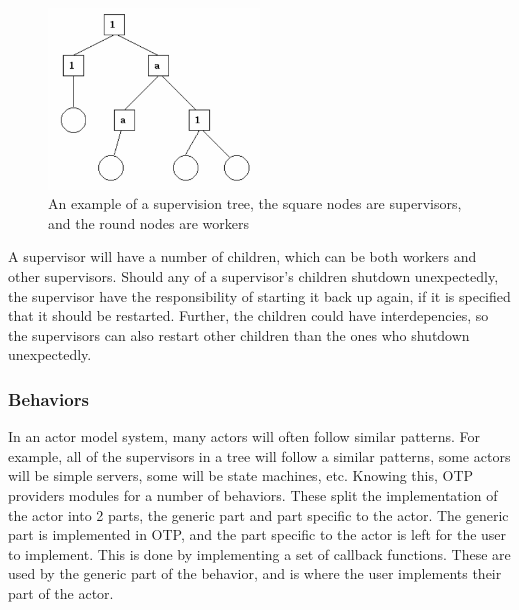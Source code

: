\documentclass[a4paper]{article}
\begin{document}
\begin{figure}[h]
  \centering
  \includegraphics[width=0.5\textwidth]{./resources/SupervisionTree.png}
  \caption{An example of a supervision tree, the square nodes are supervisors,
    and the round nodes are workers} %
  \label{fig:supervision_tree}
\end{figure}

\noindent
A supervisor will have a number of children, which can be both workers and other
supervisors. Should any of a supervisor's children shutdown unexpectedly, the
supervisor have the responsibility of starting it back up again, if it is
specified that it should be restarted. Further, the children could have
interdepencies, so the supervisors can also restart other children than the ones
who shutdown unexpectedly.

\subsubsection{Behaviors}
In an actor model system, many actors will often follow similar patterns. For
example, all of the supervisors in a tree will follow a similar patterns, some
actors will be simple servers, some will be state machines, etc. Knowing this,
OTP providers modules for a number of behaviors. These split the implementation
of the actor into 2 parts, the generic part and part specific to the actor. The
generic part is implemented in OTP, and the part specific to the actor is left
for the user to implement. This is done by implementing a set of callback
functions. These are used by the generic part of the behavior, and is where the
user implements their part of the actor.
\end{document}
